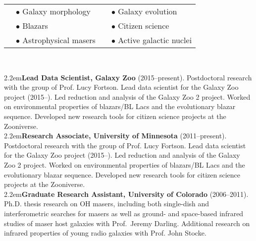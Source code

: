 
\medskip
{}
\vskip2pt
\medskip
\begin{tabular}{llll}
\hspace{50pt} & {$\bullet$ \large Galaxy morphology}  & \hspace{50pt} & {$\bullet$ \large Galaxy evolution}             \\
\hspace{50pt} & {$\bullet$ \large Blazars}        & \hspace{50pt} & {$\bullet$ \large Citizen science} \\
\hspace{50pt} & {$\bullet$ \large Astrophysical masers }   & \hspace{50pt} & {$\bullet$ \large Active galactic nuclei}          \\
\end{tabular}

\medskip\medskip
{}\\
\medskip

\hangindent2.2em{\large {\bf{\sc Lead Data Scientist}, Galaxy Zoo} (2015--present)}.  Postdoctoral research with the group of Prof. Lucy Fortson. Lead data scientist for the Galaxy Zoo project (2015--). Led reduction and analysis of the Galaxy Zoo 2 project. Worked on environmental properties of blazars/BL Lacs and the evolutionary blazar sequence. Developed new research tools for citizen science projects at the Zooniverse. \\[4pt]
\hangindent2.2em{\large {\bf{\sc Research Associate}, University of Minnesota} (2011--present)}.  Postdoctoral research with the group of Prof. Lucy Fortson. Lead data scientist for the Galaxy Zoo project (2015--). Led reduction and analysis of the Galaxy Zoo 2 project. Worked on environmental properties of blazars/BL Lacs and the evolutionary blazar sequence. Developed new research tools for citizen science projects at the Zooniverse. \\[4pt]
\hangindent2.2em{\large {\bf{\sc Graduate Research Assistant}, University of Colorado} (2006--2011)}.  Ph.D. thesis research on OH masers, including both single-dish and interferometric searches for masers as well as ground- and space-based infrared studies of maser host galaxies with Prof.~Jeremy Darling. Additional research on infrared properties of young radio galaxies with Prof. John Stocke.\\[4pt]

